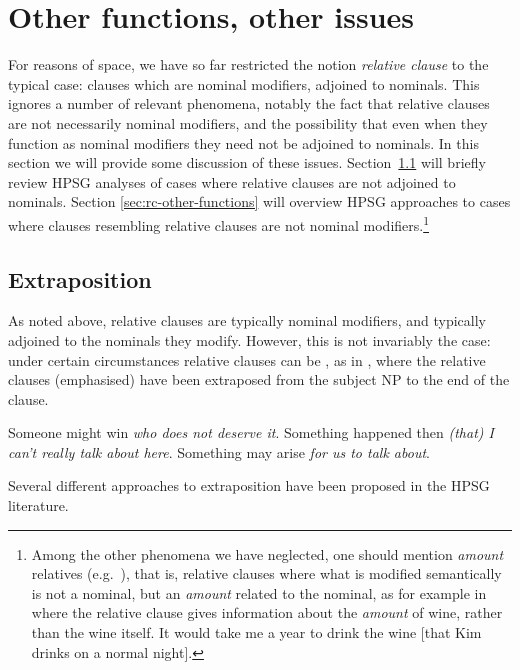 \documentclass[output=paper,biblatex,babelshorthands,newtxmath,draftmode,colorlinks,citecolor=brown]{langscibook}
\begin{document}
\section{Other functions, other issues}
\label{sec:rc-other-functions-other-issues}
For reasons of space, we have so far restricted the notion \emph{relative clause} to the
typical case: clauses which are nominal modifiers, adjoined to nominals. This ignores a
number of relevant phenomena, notably the fact that relative clauses
are not necessarily nominal modifiers, and the possibility that even when they function as
nominal modifiers they need not be adjoined to nominals. In this section we will provide
some discussion of these issues. Section~\ref{sec:rc-extraposition} will briefly review
HPSG analyses of cases where relative clauses are not adjoined to nominals. Section
\ref{sec:rc-other-functions} will overview HPSG approaches to cases where clauses resembling relative
clauses are not nominal modifiers.\footnote{Among the other phenomena we have neglected,
  one should mention \emph{amount} relatives (e.g.\ \citealt{grosu2016amount}), that is, relative clauses where what is
  modified semantically is not a nominal, but an \emph{amount} related to the nominal, as
  for example in  where the relative clause gives information about the \emph{amount}
  of wine, rather than the wine itself.
  \ea\label{x:rc-120}
    It would take me a year to drink the wine [that Kim drinks on a normal night].  
  \zlast
}

\subsection{Extraposition}
\label{sec:rc-extraposition}

%
As noted above, relative clauses are typically nominal modifiers, and typically adjoined
to the nominals they modify. However, this is not invariably the case: under certain
circumstances relative clauses can be , as in , where the
relative clauses (emphasised) have been extraposed from the subject NP to the end of the
clause.
\begin{exe}\ex\begin{xlist}\label{x:rc-121}
  \ex\label{x:rc-122} Someone might win \emph{who does not deserve it}.
  \ex\label{x:rc-123} Something happened then \emph{(that) I can't really talk about here}.
  \ex\label{x:rc-124} Something may arise \emph{for us to talk about}.
\end{xlist}\end{exe}
Several different approaches to extraposition have been proposed in the HPSG literature.
\end{document}
